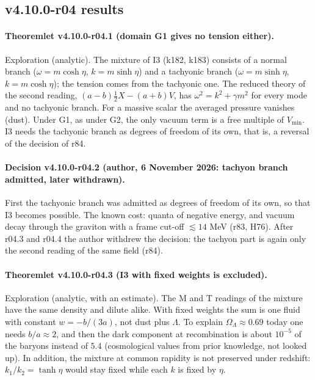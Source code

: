 \subsection*{v4.10.0-r04 results}
\label{subsec:v4100-r04-results}

\paragraph{Theoremlet v4.10.0-r04.1 (domain G1 gives no tension either).}
Exploration (analytic).  The mixture of I3 (k182, k183) consists of a normal branch (\(\omega=m\cosh\eta\), \(k=m\sinh\eta\)) and a tachyonic
branch (\(\omega=m\sinh\eta\), \(k=m\cosh\eta\)); the tension comes from the tachyonic one.  The reduced theory of the second reading,
\((a-b)\tfrac12X-(a+b)V\), has \(\omega^2=k^2+\gamma m^2\) for every mode and no tachyonic branch.  For a massive scalar the averaged pressure
vanishes (dust).  Under G1, as under G2, the only vacuum term is a free multiple of \(V_{\min}\).  I3 needs the tachyonic branch as degrees of freedom
of its own, that is, a reversal of the decision of r84.

\paragraph{Decision v4.10.0-r04.2 (author, 6 November 2026: tachyon branch admitted, later withdrawn).}
First the tachyonic branch was admitted as degrees of freedom of its own, so that I3 becomes possible.  The known cost: quanta of negative energy, and
vacuum decay through the graviton with a frame cut-off \(\lesssim14\) MeV (r83, H76).  After r04.3 and r04.4 the author withdrew the decision: the
tachyon part is again only the second reading of the same field (r84).

\paragraph{Theoremlet v4.10.0-r04.3 (I3 with fixed weights is excluded).}
Exploration (analytic, with an estimate).  The M and T readings of the mixture have the same density and dilute alike.  With fixed weights the sum is
one fluid with constant \(w=-b/(3a)\), not dust plus \(\Lambda\).  To explain \(\Omega_\Lambda\approx0.69\) today one needs \(b/a\approx2\), and then the dark
component at recombination is about \(10^{-5}\) of the baryons instead of \(5.4\) (cosmological values from prior knowledge, not looked up).  In
addition, the mixture at common rapidity is not preserved under redshift: \(k_1/k_2=\tanh\eta\) would stay fixed while each \(k\) is fixed by \(\eta\).

